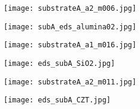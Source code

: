 \begin{figure}
    \centering
    \begin{subfigure}[t]{\textwidth}
        \caption{}\label{fig:subAa_polishing-grit}
          \begin{minipage}[t]{0.43\linewidth}
            \centering
            \texttt{[image: substrateA\_a2\_m006.jpg]}
          \end{minipage}
          \hfill
          \begin{minipage}[t]{0.43\linewidth}
            \centering
            \texttt{[image: subA\_eds\_alumina02.jpg]}
          \end{minipage}
          \begin{minipage}[t]{0.11\linewidth}
            \centering
            \atomicTable[&][&][&]
          \end{minipage}
    \end{subfigure}
    \par\bigskip
    \begin{subfigure}[t]{\textwidth}
        \caption{}\label{fig:subAa_large-grit}
          \begin{minipage}[t]{0.43\linewidth}
            \centering
            \texttt{[image: substrateA\_a1\_m016.jpg]}
          \end{minipage}
          \hfill
          \begin{minipage}[t]{0.43\linewidth}
            \centering
            \texttt{[image: eds\_subA\_SiO2.jpg]}
          \end{minipage}
          \begin{minipage}[t]{0.11\linewidth}
            \centering
            \atomicTable[&][&][&]
          \end{minipage}
    \end{subfigure}
    \par\bigskip
    \begin{subfigure}[t]{\textwidth}
        \caption{}\label{fig:subAa_czt-particle}
          \begin{minipage}[t]{0.43\linewidth}
            \centering
            \texttt{[image: substrateA\_a2\_m011.jpg]}
          \end{minipage}
          \hfill
          \begin{minipage}[t]{0.43\linewidth}
            \centering
            \texttt{[image: eds\_subA\_CZT.jpg]}
          \end{minipage}

\end{subfigure}
\end{figure}
